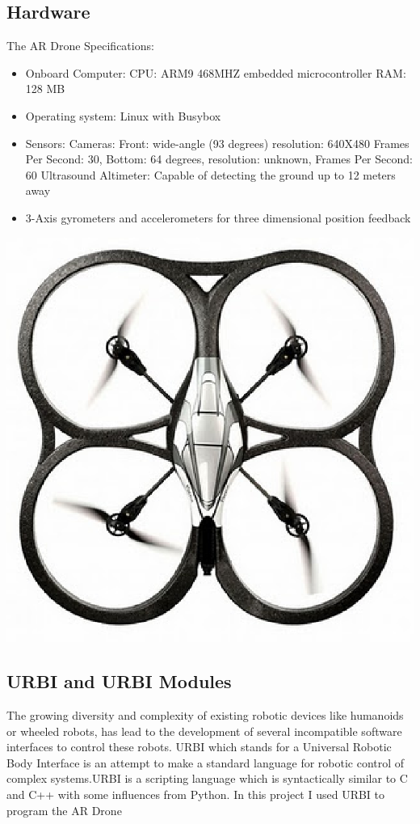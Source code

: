 \documentclass[a4paper,12pt]{report}
\begin{document}
\subsection{Hardware}
The AR Drone Specifications:
\begin{itemize}
 \item Onboard Computer:
CPU: ARM9 468MHZ embedded microcontroller
RAM: 128 MB
\item Operating system: Linux with Busybox
\item Sensors:
Cameras: Front: wide-angle (93 degrees) resolution: 640X480 Frames Per Second: 30, Bottom: 64 degrees, resolution: unknown, Frames Per Second: 60
Ultrasound Altimeter: Capable of detecting the ground up to 12 meters away
\item 3-Axis gyrometers and accelerometers for three dimensional position feedback 
\end{itemize}
\includegraphics{top_down.eps}
	
\subsection{URBI and URBI Modules}
The growing diversity and complexity of existing robotic devices like humanoids 
or wheeled robots, has lead to the development of several incompatible software interfaces to control these robots. 
URBI which stands for a Universal Robotic Body Interface is an attempt to make a standard language for robotic control of complex systems.URBI is a scripting language which is syntactically similar to C and C++ with some influences from Python. In this project I used URBI to program the AR Drone
\end{document}
